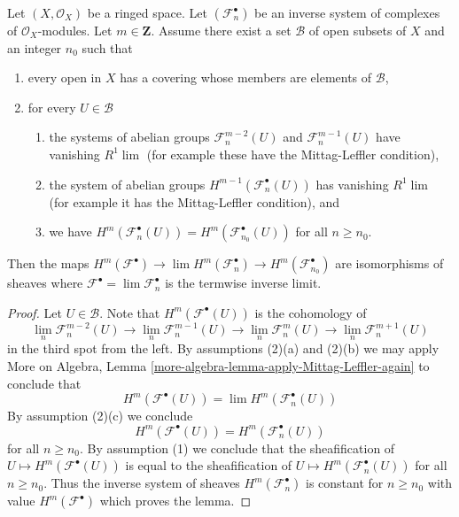 \begin{lemma}
\label{lemma-inverse-limit-complexes}
Let $(X, \mathcal{O}_X)$ be a ringed space. Let $(\mathcal{F}_n^\bullet)$
be an inverse system of complexes of $\mathcal{O}_X$-modules.
Let $m \in \mathbf{Z}$. Assume there exist a set $\mathcal{B}$
of open subsets of $X$ and an integer $n_0$ such that
\begin{enumerate}
\item every open in $X$ has a covering whose members are
elements of $\mathcal{B}$,
\item for every $U \in \mathcal{B}$
\begin{enumerate}
\item the systems of abelian groups
$\mathcal{F}_n^{m - 2}(U)$ and $\mathcal{F}_n^{m - 1}(U)$
have vanishing $R^1\lim$ (for example these have the Mittag-Leffler
condition),
\item the system of abelian groups $H^{m - 1}(\mathcal{F}_n^\bullet(U))$
has vanishing $R^1\lim$ (for example it has the Mittag-Leffler condition), and
\item we have
$H^m(\mathcal{F}_n^\bullet(U)) = H^m(\mathcal{F}_{n_0}^\bullet(U))$
for all $n \geq n_0$.
\end{enumerate}
\end{enumerate}
Then the maps
$H^m(\mathcal{F}^\bullet) \to \lim H^m(\mathcal{F}_n^\bullet) \to
H^m(\mathcal{F}_{n_0}^\bullet)$
are isomorphisms of sheaves where
$\mathcal{F}^\bullet = \lim \mathcal{F}_n^\bullet$ is the termwise
inverse limit.
\end{lemma}

\begin{proof}
Let $U \in \mathcal{B}$. Note that $H^m(\mathcal{F}^\bullet(U))$ is the
cohomology of
$$
\lim_n \mathcal{F}_n^{m - 2}(U) \to
\lim_n \mathcal{F}_n^{m - 1}(U) \to
\lim_n \mathcal{F}_n^m(U) \to
\lim_n \mathcal{F}_n^{m + 1}(U)
$$
in the third spot from the left. By assumptions (2)(a) and (2)(b)
we may apply
More on Algebra, Lemma \ref{more-algebra-lemma-apply-Mittag-Leffler-again}
to conclude that
$$
H^m(\mathcal{F}^\bullet(U)) = \lim H^m(\mathcal{F}_n^\bullet(U))
$$
By assumption (2)(c) we conclude
$$
H^m(\mathcal{F}^\bullet(U)) = H^m(\mathcal{F}_n^\bullet(U))
$$
for all $n \geq n_0$. By assumption (1) we conclude that the sheafification of
$U \mapsto H^m(\mathcal{F}^\bullet(U))$ is equal to the sheafification
of $U \mapsto H^m(\mathcal{F}_n^\bullet(U))$ for all $n \geq n_0$.
Thus the inverse system of sheaves $H^m(\mathcal{F}_n^\bullet)$ is
constant for $n \geq n_0$ with value $H^m(\mathcal{F}^\bullet)$ which
proves the lemma.
\end{proof}

